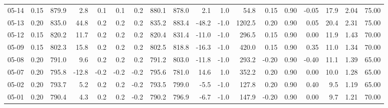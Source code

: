 \begin{threeparttable}
{\begin{tabular}{lrrrrrrrrrrrrrrrrr}
  05-14 &     0.15 & 879.9 &               2.8 &               0.1 &                0.1 &                0.2 & 880.1 & 878.0 &        2.1 &                      1.0 &                54.8 &       0.15 &      0.90 &          -0.05 &             17.9 &            2.04 &                  75.00 \\
  05-13 &     0.20 & 835.0 &              44.8 &               0.2 &                0.2 &                0.2 & 835.2 & 883.4 &      -48.2 &                     -1.0 &              1202.5 &       0.20 &      0.90 &           0.05 &             20.4 &            2.31 &                  75.00 \\
  05-12 &     0.15 & 820.2 &              11.7 &               0.2 &                0.2 &                0.2 & 820.4 & 831.4 &      -11.0 &                     -1.0 &               296.5 &       0.15 &      0.90 &           0.00 &             11.9 &            1.43 &                  70.00 \\
  05-09 &     0.15 & 802.3 &              15.8 &               0.2 &                0.2 &                0.2 & 802.5 & 818.8 &      -16.3 &                     -1.0 &               420.0 &       0.15 &      0.90 &           0.35 &             11.0 &            1.34 &                  70.00 \\
  05-08 &     0.20 & 791.0 &               9.6 &               0.2 &                0.2 &                0.2 & 791.2 & 803.0 &      -11.8 &                     -1.0 &               293.2 &      -0.20 &      0.90 &          -0.40 &             11.1 &            1.39 &                  65.00 \\
  05-07 &     0.20 & 795.8 &             -12.8 &              -0.2 &               -0.2 &               -0.2 & 795.6 & 781.0 &       14.6 &                      1.0 &               352.2 &       0.20 &      0.90 &           0.00 &             10.0 &            1.28 &                  65.00 \\
  05-02 &     0.20 & 793.7 &               5.2 &               0.2 &                0.2 &               -0.2 & 793.5 & 799.0 &       -5.5 &                     -1.0 &               127.8 &       0.20 &      0.90 &           0.40 &              9.5 &            1.19 &                  65.00 \\
  05-01 &     0.20 & 790.4 &               4.3 &               0.2 &                0.2 &               -0.2 & 790.2 & 796.9 &       -6.7 &                     -1.0 &               147.9 &      -0.20 &      0.90 &           0.00 &              9.7 &            1.21 &                  70.00 \\

\end{tabular}}
\end{threeparttable}
